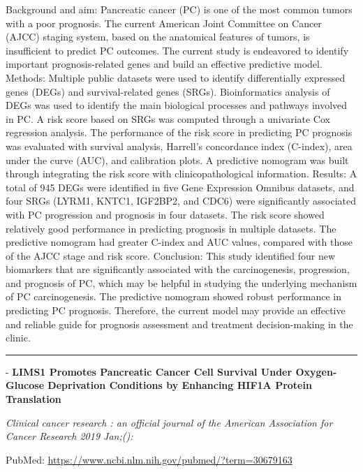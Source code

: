 \documentclass[]{article}
\begin{document}
Background and aim: Pancreatic cancer (PC) is one of the most common
tumors with a poor prognosis. The current American Joint Committee on
Cancer (AJCC) staging system, based on the anatomical features of
tumors, is insufficient to predict PC outcomes. The current study is
endeavored to identify important prognosis-related genes and build an
effective predictive model. Methods: Multiple public datasets were used
to identify differentially expressed genes (DEGs) and survival-related
genes (SRGs). Bioinformatics analysis of DEGs was used to identify the
main biological processes and pathways involved in PC. A risk score
based on SRGs was computed through a univariate Cox regression analysis.
The performance of the risk score in predicting PC prognosis was
evaluated with survival analysis, Harrell's concordance index (C-index),
area under the curve (AUC), and calibration plots. A predictive nomogram
was built through integrating the risk score with clinicopathological
information. Results: A total of 945 DEGs were identified in five Gene
Expression Omnibus datasets, and four SRGs (LYRM1, KNTC1, IGF2BP2, and
CDC6) were significantly associated with PC progression and prognosis in
four datasets. The risk score showed relatively good performance in
predicting prognosis in multiple datasets. The predictive nomogram had
greater C-index and AUC values, compared with those of the AJCC stage
and risk score. Conclusion: This study identified four new biomarkers
that are significantly associated with the carcinogenesis, progression,
and prognosis of PC, which may be helpful in studying the underlying
mechanism of PC carcinogenesis. The predictive nomogram showed robust
performance in predicting PC prognosis. Therefore, the current model may
provide an effective and reliable guide for prognosis assessment and
treatment decision-making in the clinic.

{}

{}

\begin{center}\rule{0.5\linewidth}{\linethickness}\end{center}

 - \textbf{LIMS1 Promotes Pancreatic Cancer Cell Survival Under
Oxygen-Glucose Deprivation Conditions by Enhancing HIF1A Protein
Translation}

\emph{Clinical cancer research : an official journal of the American
Association for Cancer Research 2019 Jan;():}

PubMed: \url{https://www.ncbi.nlm.nih.gov/pubmed/?term=30679163}
\end{document}
